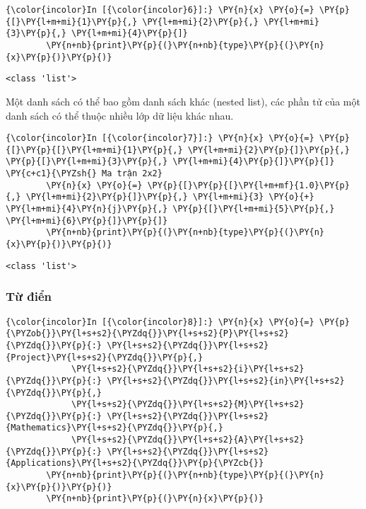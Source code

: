     
\begin{Verbatim}[commandchars=\\\{\}]
{\color{incolor}In [{\color{incolor}6}]:} \PY{n}{x} \PY{o}{=} \PY{p}{[}\PY{l+m+mi}{1}\PY{p}{,} \PY{l+m+mi}{2}\PY{p}{,} \PY{l+m+mi}{3}\PY{p}{,} \PY{l+m+mi}{4}\PY{p}{]}
        \PY{n+nb}{print}\PY{p}{(}\PY{n+nb}{type}\PY{p}{(}\PY{n}{x}\PY{p}{)}\PY{p}{)}
\end{Verbatim}
    

    \begin{Verbatim}[commandchars=\\\{\}]
<class 'list'>

    \end{Verbatim}

    Một danh sách có thể bao gồm danh sách khác (nested list), các phần tử
của một danh sách có thể thuộc nhiều lớp dữ liệu khác nhau.

    
\begin{Verbatim}[commandchars=\\\{\}]
{\color{incolor}In [{\color{incolor}7}]:} \PY{n}{x} \PY{o}{=} \PY{p}{[}\PY{p}{[}\PY{l+m+mi}{1}\PY{p}{,} \PY{l+m+mi}{2}\PY{p}{]}\PY{p}{,} \PY{p}{[}\PY{l+m+mi}{3}\PY{p}{,} \PY{l+m+mi}{4}\PY{p}{]}\PY{p}{]} \PY{c+c1}{\PYZsh{} Ma trận 2x2}
        \PY{n}{x} \PY{o}{=} \PY{p}{[}\PY{p}{[}\PY{l+m+mf}{1.0}\PY{p}{,} \PY{l+m+mi}{2}\PY{p}{]}\PY{p}{,} \PY{l+m+mi}{3} \PY{o}{+} \PY{l+m+mi}{4}\PY{n}{j}\PY{p}{,} \PY{p}{[}\PY{l+m+mi}{5}\PY{p}{,} \PY{l+m+mi}{6}\PY{p}{]}\PY{p}{]}
        \PY{n+nb}{print}\PY{p}{(}\PY{n+nb}{type}\PY{p}{(}\PY{n}{x}\PY{p}{)}\PY{p}{)}
\end{Verbatim}
    

    \begin{Verbatim}[commandchars=\\\{\}]
<class 'list'>

    \end{Verbatim}

    \subsubsection{Từ điển}\label{tux1eeb-ux111iux1ec3n}

    
\begin{Verbatim}[commandchars=\\\{\}]
{\color{incolor}In [{\color{incolor}8}]:} \PY{n}{x} \PY{o}{=} \PY{p}{\PYZob{}}\PY{l+s+s2}{\PYZdq{}}\PY{l+s+s2}{P}\PY{l+s+s2}{\PYZdq{}}\PY{p}{:} \PY{l+s+s2}{\PYZdq{}}\PY{l+s+s2}{Project}\PY{l+s+s2}{\PYZdq{}}\PY{p}{,}
             \PY{l+s+s2}{\PYZdq{}}\PY{l+s+s2}{i}\PY{l+s+s2}{\PYZdq{}}\PY{p}{:} \PY{l+s+s2}{\PYZdq{}}\PY{l+s+s2}{in}\PY{l+s+s2}{\PYZdq{}}\PY{p}{,}
             \PY{l+s+s2}{\PYZdq{}}\PY{l+s+s2}{M}\PY{l+s+s2}{\PYZdq{}}\PY{p}{:} \PY{l+s+s2}{\PYZdq{}}\PY{l+s+s2}{Mathematics}\PY{l+s+s2}{\PYZdq{}}\PY{p}{,}
             \PY{l+s+s2}{\PYZdq{}}\PY{l+s+s2}{A}\PY{l+s+s2}{\PYZdq{}}\PY{p}{:} \PY{l+s+s2}{\PYZdq{}}\PY{l+s+s2}{Applications}\PY{l+s+s2}{\PYZdq{}}\PY{p}{\PYZcb{}}
        \PY{n+nb}{print}\PY{p}{(}\PY{n+nb}{type}\PY{p}{(}\PY{n}{x}\PY{p}{)}\PY{p}{)}
        \PY{n+nb}{print}\PY{p}{(}\PY{n}{x}\PY{p}{)}
\end{Verbatim}
    

